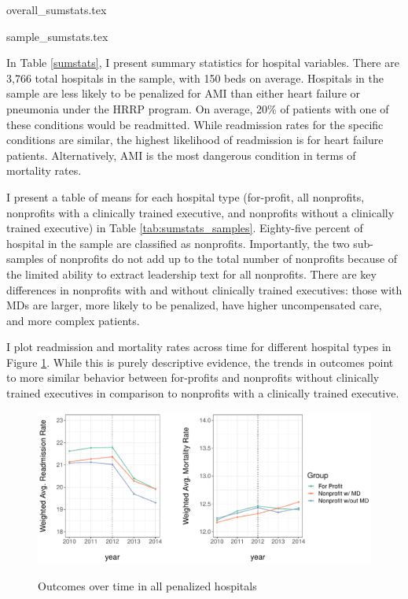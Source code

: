 \documentclass[12pt]{article}
\begin{document}
    {overall_sumstats.tex}

    {sample_sumstats.tex}

    In Table \ref{sumstats}, I present summary statistics for hospital variables. There are 3,766 total hospitals in the sample, with 150 beds on average. Hospitals in the sample are less likely to be penalized for AMI than either heart failure or pneumonia under the HRRP program. On average, 20\% of patients with one of these conditions would be readmitted. While readmission rates for the specific conditions are similar, the highest likelihood of readmission is for heart failure patients. Alternatively, AMI is the most dangerous condition in terms of mortality rates. 


    I present a table of means for each hospital type (for-profit, all nonprofits, nonprofits with a clinically trained executive, and nonprofits without a clinically trained executive) in Table \ref{tab:sumstats_samples}. Eighty-five percent of hospital in the sample are classified as nonprofits. Importantly, the two sub-samples of nonprofits do not add up to the total number of nonprofits because of the limited ability to extract leadership text for all nonprofits. There are key differences in nonprofits with and without clinically trained executives: those with MDs are larger, more likely to be penalized, have higher uncompensated care, and more complex patients.  


    I plot readmission and mortality rates across time for different hospital types in Figure \ref{fig:weighted_read_mort_graph}. While this is purely descriptive evidence, the trends in outcomes point to more similar behavior between for-profits and nonprofits without clinically trained executives in comparison to nonprofits with a clinically trained executive.

    \begin{figure}[ht!]
    \centering
        \caption{Outcomes over time in all penalized hospitals}
        \includegraphics[width=\textwidth]{Objects/weighted_read_mort_graph.pdf}
        \label{fig:weighted_read_mort_graph}
    \end{figure}
\end{document}
